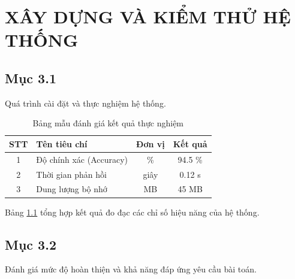 \chapter{XÂY DỰNG VÀ KIỂM THỬ HỆ THỐNG}

\section{Mục 3.1}
Quá trình cài đặt và thực nghiệm hệ thống.

\begin{table}[htbp]
  \centering
  \caption{Bảng mẫu đánh giá kết quả thực nghiệm}
  \label{tab:sample}
  \begin{tabular}{|c|l|c|c|}
    \hline
    \textbf{STT} & \textbf{Tên tiêu chí}   & \textbf{Đơn vị} & \textbf{Kết quả} \\ \hline
    1            & Độ chính xác (Accuracy) & \%              & 94.5 \%          \\ \hline
    2            & Thời gian phản hồi      & giây            & 0.12 s           \\ \hline
    3            & Dung lượng bộ nhớ       & MB              & 45 MB            \\ \hline
  \end{tabular}
\end{table}

Bảng \ref{tab:sample} tổng hợp kết quả đo đạc các chỉ số hiệu năng của hệ thống.

\section{Mục 3.2}
Đánh giá mức độ hoàn thiện và khả năng đáp ứng yêu cầu bài toán.
